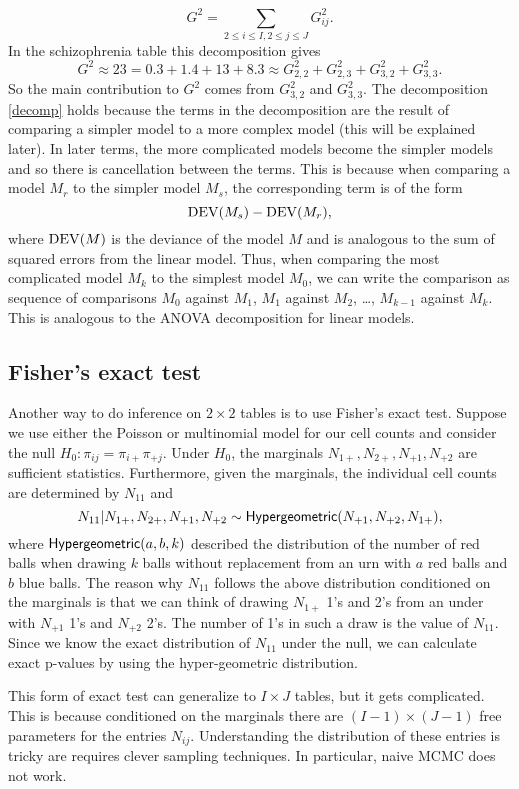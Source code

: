 \begin{equation}\label{decomp} G^2 = \sum_{2\le i \le I, 2\le j \le J} G_{ij}^2. \end{equation}
In the schizophrenia table this decomposition gives
\[G^2 \approx 23 = 0.3+1.4+13+8.3 \approx G_{2,2}^2+G_{2,3}^2+G_{3,2}^2+G_{3,3}^2. \]
So the main contribution to $G^2$ comes from $G_{3,2}^2$ and $G_{3,3}^2$.  The decomposition \eqref{decomp} holds because the terms in the decomposition are the result of comparing a simpler model to a more complex model (this will be explained later). In later terms, the more complicated models become the simpler models and so there is cancellation between the terms. This is because when comparing a model $M_r$ to the simpler model $M_s$, the corresponding term is of the form
\[\operatorname{DEV}(M_s)-\operatorname{DEV}(M_r),\]
where $\operatorname{DEV}(M)$ is the deviance of the model $M$ and is analogous to the sum of squared errors from the linear model. Thus, when comparing the most complicated model $M_k$ to the simplest model $M_0$, we can write the comparison as sequence of comparisons $M_0$ against $M_1$, $M_1$ against $M_2$, \ldots, $M_{k-1}$ against $M_k$. This is analogous to the ANOVA decomposition for linear models.
\subsection{Fisher's exact test}
Another way to do inference on $2 \times 2$ tables is to use Fisher's exact test. Suppose we use either the Poisson or multinomial model for our cell counts and consider the null $H_0 : \pi_{ij} = \pi_{i+}\pi_{+j}$. Under $H_0$, the marginals $N_{1+}, N_{2+}, N_{+1}, N_{+2}$ are sufficient statistics. Furthermore, given the marginals, the individual cell counts are determined by $N_{11}$ and 
\[N_{11}|N_{1+}, N_{2+}, N_{+1}, N_{+2} \sim \mathsf{Hypergeometric}(N_{+1}, N_{+2}, N_{1+}), \]
where $\mathsf{Hypergeometric}(a,b,k)$ described the distribution of the number of red balls when drawing $k$ balls without replacement from an urn with $a$ red balls and $b$ blue balls. The reason why $N_{11}$ follows the above distribution conditioned on the marginals is that we can think of drawing $N_{1+}$ 1's and 2's from an under with $N_{+1}$ 1's and $N_{+2}$ 2's. The number of 1's in such a draw is the value of $N_{11}$. Since we know the exact distribution of $N_{11}$ under the null, we can calculate exact p-values by using the hyper-geometric distribution.

This form of exact test can generalize to $I \times J$ tables, but it gets complicated. This is because conditioned on the marginals there are $(I-1)\times(J-1)$ free parameters for the entries $N_{ij}$. Understanding the distribution of these entries is tricky are requires clever sampling techniques. In particular, naive MCMC does not work.
